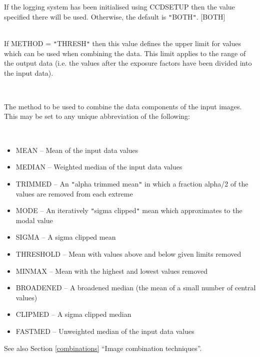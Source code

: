 \documentclass[twoside,11pt]{article}
\newcommand{\htmlref}[2]{#1}
\newcommand{\latexhtml}[2]{#1}
\renewcommand{\_}{\texttt{\symbol{95}}}
\newcommand{\qt}[1]{{\tt "}#1{\tt "}}
\newcommand{\xroutine}[1]{\htmlref{{\sc #1}}{#1}}
\newcommand{\secref}[2]{\latexhtml{Section \ref{#1} ``#2''}{``\htmlref{#2}{#1}''}}
\newcommand{\sstsubsection}[1]{ \item[{#1}] \mbox{} \\}
\newcommand{\sstitemlist}[1]{
  \mbox{} \\
  \vspace{-3.5ex}
  \begin{itemize}
     #1
  \end{itemize}
}
\newcommand{\sstitem}{\item}
\newcommand{\sstsubsection}[1]{\item[{#1}]}
\newcommand{\sstitemlist}[1]{
      \begin{itemize}
         #1
      \end{itemize}
      \\
   }
\newcommand{\sstitem}{\item}
\begin{document}
{{{{         }
         If the logging system has been initialised using \xroutine{CCDSETUP}
         then the value specified there will be used. Otherwise, the
         default is \qt{BOTH}.
         [BOTH]
      }
      \sstsubsection{
         MAX = \_REAL (Read)
      } {
         If METHOD = \qt{THRESH} then this value defines the upper limit
         for values which can be used when combining the data. This
         limit applies to the range of the output data (i.e. the values
         after the exposure factors have been divided into the input
         data).
      }
      \sstsubsection{
         METHOD = LITERAL (Read)
      } {
         The method to be used to combine the data components of
         the input images. This may be set to any unique abbreviation of
         the following:
         \sstitemlist{

            \sstitem
               MEAN      -- Mean of the input data values

            \sstitem
               MEDIAN    -- Weighted median of the input data values

            \sstitem
               TRIMMED   -- An \qt{alpha trimmed mean} in which a fraction
                               alpha/2 of the values are removed from
                               each extreme

            \sstitem
               MODE      -- An iteratively \qt{sigma clipped} mean which
                               approximates to the modal value

            \sstitem
               SIGMA     -- A sigma clipped mean

            \sstitem
               THRESHOLD -- Mean with values above and below given
                               limits removed

            \sstitem
               MINMAX    -- Mean with the highest and lowest values
                               removed

            \sstitem
               BROADENED -- A broadened median (the mean of a small
                               number of central values)

            \sstitem
               CLIPMED   -- A sigma clipped median

            \sstitem
               FASTMED   -- Unweighted median of the input data values
         }
         See also \secref{combinations}{Image combination techniques}.

}}}
\end{document}
